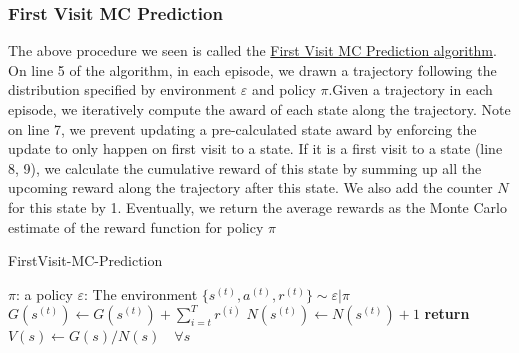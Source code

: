 \documentclass[11pt]{article}
\begin{document}
\subsubsection{First Visit MC Prediction}
The above procedure we seen is called the \hyperref[alg:fvmp]{First Visit MC Prediction algorithm}. On line 5 of the algorithm, in each episode, we drawn a trajectory following the distribution specified by environment \(\varepsilon\) and policy \(\pi\).Given a trajectory in each episode, we iteratively compute the award of each state along the trajectory. Note on line 7, we prevent updating a pre-calculated state award by enforcing the update to only happen on first visit to a state. If it is a first visit to a state (line 8, 9), we calculate the cumulative reward of this state by summing up all the upcoming reward along the trajectory after this state. We also add the counter \(N\) for this state by 1. Eventually, we return the average rewards as the Monte Carlo estimate of the reward function for policy \(\pi\)
\begin{algorithm}
\caption{FirstVisit-MC-Prediction}
\label{alg:fvmp}
\begin{algorithmic}[1]
\State $\pi$: a policy
\State $\varepsilon$: The environment
    \State $\{s^{(t)}, a^{(t)}, r^{(t)}\} \sim \varepsilon | \pi$
            \State $G(s^{(t)}) \gets G(s^{(t)}) + \sum_{i=t}^T r^{(i)}$
            \State $N(s^{(t)}) \gets N(s^{(t)}) + 1$
        \EndIf
        \EndFor
    \EndFor
    \State \textbf{return} $V(s) \gets G(s) / N(s) \quad \forall s$
    \EndProcedure
\end{algorithmic}
\end{algorithm}
\end{document}
